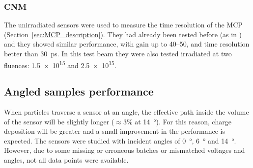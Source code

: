 \subsubsection{CNM}

The unirradiated sensors were used to measure the time resolution of the MCP (Section~\ref{sec:MCP_description}). They had already been tested before (as in \cite{Allaire:2018bof}) and they showed similar performance, with gain up to \qtyrange{40}{50}{}, and time resolution better than \qty{30}{\pico\second}. In this test beam they were also tested irradiated at two fluences: \qty{1.5e15}{\neutroneq} and \qty{2.5e15}{\neutroneq}.

\begin{figure}[h!tbp]
    \centering
    \hfill
    \vfill
    \begin{minipage}[c]{.47\linewidth}
    \end{minipage}
    \hfill
    \begin{minipage}[c]{.5\linewidth}
\end{minipage}
\end{figure}

\FloatBarrier 

\subsection{Angled samples performance}

When particles traverse a sensor at an angle, the effective path inside the volume of the sensor will be slightly longer (\(\approx3\%\) at \qty{14}{\degree}). For this reason, charge deposition will be greater and a small improvement in the performance is expected.
The sensors were studied with incident angles of \qty{0}{\degree}, \qty{6}{\degree} and \qty{14}{\degree}. However, due to some missing or erroneous batches or mismatched voltages and angles, not all data points were available.

